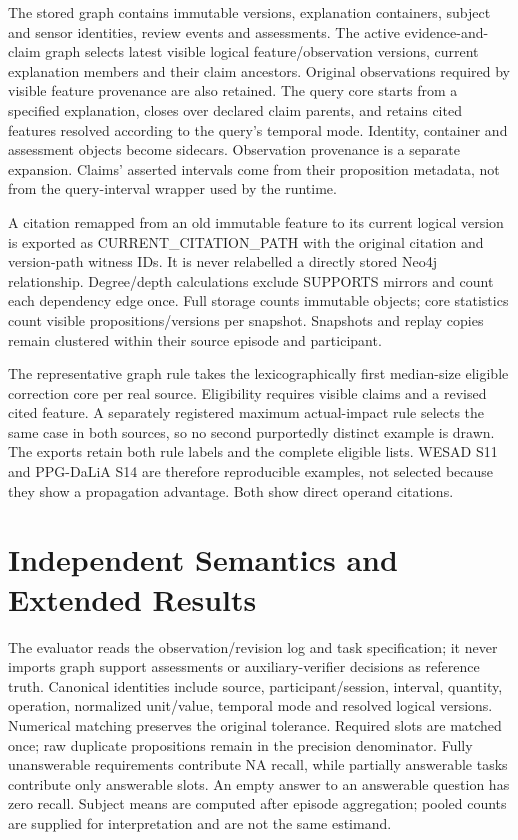 \documentclass[runningheads]{llncs}
\newcommand{\suppTable}[3]{\begin{table}[!ht]\caption{#2}\label{#3}\centering\scriptsize
\setlength{\tabcolsep}{3pt}\end{table}}
\begin{document}
The stored graph contains immutable versions, explanation containers, subject and
sensor identities, review events and assessments. The active evidence-and-claim
graph selects latest visible logical feature/observation versions, current
explanation members and their claim ancestors. Original observations required
by visible feature provenance are also retained. The query core starts from a
specified explanation, closes over declared claim parents, and retains cited
features resolved according to the query's temporal mode. Identity, container
and assessment objects become sidecars. Observation provenance is a separate
expansion. Claims' asserted intervals come from their proposition metadata,
not from the query-interval wrapper used by the runtime.

A citation remapped from an old immutable feature to its current logical version
is exported as CURRENT\_CITATION\_PATH with the original citation and version-path
witness IDs. It is never relabelled a directly stored Neo4j relationship.
Degree/depth calculations exclude SUPPORTS mirrors and count each dependency
edge once. Full storage counts immutable objects; core statistics count visible
propositions/versions per snapshot. Snapshots and replay copies remain clustered
within their source episode and participant.

The representative graph rule takes the lexicographically first median-size
eligible correction core per real source. Eligibility requires visible claims
and a revised cited feature. A separately registered maximum actual-impact rule
selects the same case in both sources, so no second purportedly distinct example
is drawn. The exports retain both rule labels and the complete eligible lists.
WESAD S11 and PPG-DaLiA S14 are therefore reproducible examples, not selected
because they show a propagation advantage. Both show direct operand citations.

\section{Independent Semantics and Extended Results}
\suppTable{generated/semantic/graph_table}{Node counts for full visible storage,
active evidence-and-claim graphs and query cores, with subject-cluster 95\%
intervals. Core/stored is a percentage; final column counts nonzero exposure
among eligible revision batches. Ten subjects and 20 episodes per source.}{tab:graphsizes}

The evaluator reads the observation/revision log and task specification; it never
imports graph support assessments or auxiliary-verifier decisions as reference
truth. Canonical identities include source, participant/session, interval,
quantity, operation, normalized unit/value, temporal mode and resolved logical
versions. Numerical matching preserves the original tolerance. Required slots
are matched once; raw duplicate propositions remain in the precision denominator.
Fully unanswerable requirements contribute NA recall, while partially answerable
tasks contribute only answerable slots. An empty answer to an answerable question
has zero recall. Subject means are computed after episode aggregation; pooled
counts are supplied for interpretation and are not the same estimand.
\end{document}
